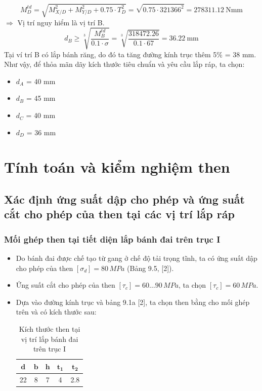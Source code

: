 \[
    M_D^{td} 
    = \sqrt{M_{X/D}^2 + M_{Y/D}^2 + 0.75 \cdot T_D^2} 
    = \sqrt{0.75 \cdot 321366^2} 
    = 278311.12\ \text{Nmm}
\]
$\Rightarrow$ Vị trí nguy hiểm là vị trí B.
\begin{equation}
    d_B \ge \sqrt[3]{\frac{M_B^{td}}{0.1 \cdot \sigma}} 
        = \sqrt[3]{\frac{318472.26}{0.1 \cdot 67}} 
        = 36.22\ \text{mm}
\end{equation}
Tại ví trí B có lắp bánh răng, do đó ta tăng đường kính trục thêm 5\% = 38 mm. \\
Như vậy, để thỏa mãn dãy kích thước tiêu chuẩn và yêu cầu lắp ráp, ta chọn:
\begin{itemize}
    \item $d_A$ = 40 mm
    \item $d_B$ = 45 mm     
    \item $d_C$ = 40 mm
    \item $d_D$ = 36 mm
\end{itemize}

\section{Tính toán và kiểm nghiệm then}
\subsection{Xác định ứng suất dập cho phép và ứng suất cắt cho phép của then tại các vị trí lắp ráp}
\subsubsection{Mối ghép then tại tiết diện lắp bánh đai trên trục I}
\begin{itemize}
    \item Do bánh đai được chế tạo từ gang ở chế độ tải trọng tĩnh, ta có ứng suất dập cho phép của then $[\sigma_d] = 80 \, MPa$ (Bảng 9.5, [2]).
    \item Ứng suất cắt cho phép của then $[\tau_c] = 60 \dots 90 \, MPa$, ta chọn $[\tau_c] = 60 \, MPa$.
    \item Dựa vào đường kính trục và bảng 9.1a [2], ta chọn then bằng cho mối ghép trên và có kích thước sau:
    \begin{table}[h!]
    \centering
    \begin{tabular}{|c|c|c|c|c|}
    \hline
    $\mathbf{d}$ & $\mathbf{b}$ & $\mathbf{h}$ & $\mathbf{t_1}$ & $\mathbf{t_2}$ \\
    \hline
    22 & 8 & 7 & 4 & 2.8 \\
    \hline
    \end{tabular}
    \caption{Kích thước then tại vị trí lắp bánh đai trên trục I}
    \end{table}
\end{itemize}
